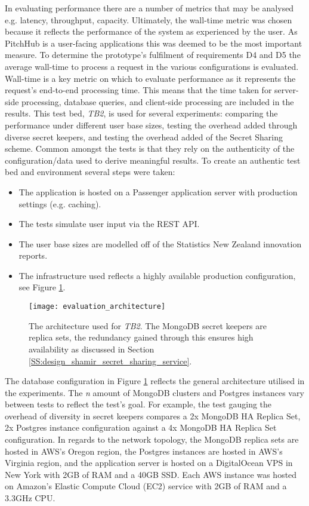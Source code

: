 In evaluating performance there are a number of metrics that may be analysed e.g. latency, throughput, capacity. Ultimately, the wall-time metric was chosen because it reflects the performance of the system as experienced by the user. As PitchHub is a user-facing applications this was deemed to be the most important measure. To determine the prototype's fulfilment of requirements D4 and D5 the average wall-time to process a request in the various configurations is evaluated. Wall-time is a key metric on which to evaluate performance as it represents the request's end-to-end processing time. This means that the time taken for server-side processing, database queries, and client-side processing are included in the results. This test bed, \textit{TB2}, is used for several experiments: comparing the performance under different user base sizes, testing the overhead added through diverse secret keepers, and testing the overhead added of the Secret Sharing scheme. Common amongst the tests is that they rely on the authenticity of the configuration/data used to derive meaningful results. To create an authentic test bed and environment several steps were taken:
\begin{itemize}  
    \item The application is hosted on a Passenger application server with production settings (e.g. caching).
    \item The tests simulate user input via the REST API.
    \item The user base sizes are modelled off of the Statistics New Zealand innovation reports.
    \item The infrastructure used reflects a highly available production configuration, see Figure \ref{fig:architecture_evaluation}.
\end{itemize}

\begin{figure}[ht]
    \centering
    \texttt{[image: evaluation\_architecture]}
    \caption{The architecture used for \textit{TB2}. The MongoDB secret keepers are replica sets, the redundancy gained through this ensures high availability as discussed in Section \ref{SS:design_shamir_secret_sharing_service}.}
    \label{fig:architecture_evaluation}
\end{figure}

The database configuration in Figure \ref{fig:architecture_evaluation} reflects the general architecture utilised in the experiments. The \textit{n} amount of MongoDB clusters and Postgres instances vary between tests to reflect the test's goal. For example, the test gauging the overhead of diversity in secret keepers compares a 2x MongoDB HA Replica Set, 2x Postgres instance configuration against a 4x MongoDB HA Replica Set configuration. In regards to the network topology, the MongoDB replica sets are hosted in AWS's Oregon region, the Postgres instances are hosted in AWS's Virginia region, and the application server is hosted on a DigitalOcean VPS in New York with 2GB of RAM and a 40GB SSD. Each AWS instance was hosted on Amazon's Elastic Compute Cloud (EC2) service with 2GB of RAM and a 3.3GHz CPU.

